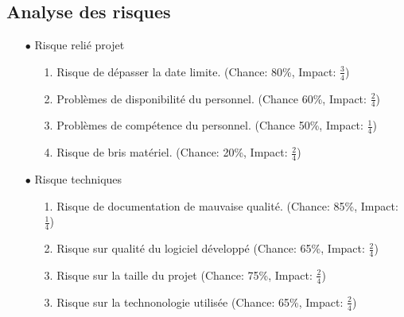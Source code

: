 \documentclass[10pt,a4paper]{report}
\begin{document}
\begin{flushleft}
				\section*{Analyse des risques}
						\begin{enumerate}
						\item[$\bullet$] Risque relié projet
						\begin{enumerate}
						\item[1.] Risque de dépasser la date limite. (Chance: 80\%, Impact: $\frac{3}{4}$)\\
						\item[2.] Problèmes de disponibilité du personnel. (Chance 60\%, Impact: $\frac{2}{4}$)\\
						\item[3.] Problèmes de compétence du personnel. (Chance 50\%, Impact: $\frac{1}{4}$)\\
						\item[4.] Risque de bris matériel. (Chance: 20\%, Impact: $\frac{2}{4}$)\\
				\end{enumerate}
				\item[$\bullet$] Risque techniques
					\begin{enumerate}
						\item[1.] Risque de documentation de mauvaise qualité. (Chance: 85\%, Impact: $\frac{1}{4}$)\\
						\item[2.] Risque sur qualité du logiciel développé  (Chance: 65\%, Impact: $\frac{2}{4}$)\\
						\item[3.] Risque sur la taille du projet  (Chance: 75\%, Impact: $\frac{2}{4}$)\\
						\item[3.] Risque sur la  technonologie utilisée (Chance: 65\%, Impact: $\frac{2}{4}$)\\
					\end{enumerate}
					\end{enumerate}
		\end{flushleft}
\end{document}
